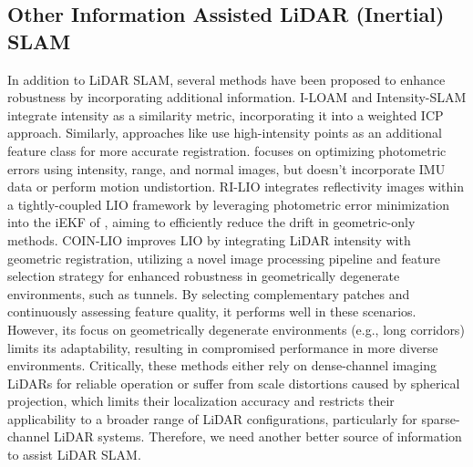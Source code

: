 
\vspace{-1mm}

\subsection{Other Information Assisted LiDAR (Inertial) SLAM}
\vspace{-1mm}
In addition to LiDAR SLAM, several methods have been proposed to enhance robustness by incorporating additional information. I-LOAM \cite{I-LOAM} and Intensity-SLAM \cite{I-SLAM} integrate intensity as a similarity metric, incorporating it into a weighted ICP approach. Similarly, approaches like \cite{I-LOAM,I-SLAM} use high-intensity points as an additional feature class for more accurate registration. \cite{MD-SLAM} focuses on optimizing photometric errors using intensity, range, and normal images, but doesn't incorporate IMU data or perform motion undistortion. RI-LIO \cite{RI-LIO} integrates reflectivity images within a tightly-coupled LIO framework by leveraging photometric error minimization into the iEKF of \cite{FAST-LIO}, aiming to efficiently reduce the drift in geometric-only methods. COIN-LIO \cite{COIN-LIO} improves LIO by integrating LiDAR intensity with geometric registration, utilizing a novel image processing pipeline and feature selection strategy for enhanced robustness in geometrically degenerate environments, such as tunnels. By selecting complementary patches and continuously assessing feature quality, it performs well in these scenarios. However, its focus on geometrically degenerate environments (e.g., long corridors) limits its adaptability, resulting in compromised performance in more diverse environments. Critically, these methods either rely on dense-channel imaging LiDARs for reliable operation or suffer from scale distortions caused by spherical projection, which limits their localization accuracy and restricts their applicability to a broader range of LiDAR configurations, particularly for sparse-channel LiDAR systems. Therefore, we need another better source of information to assist LiDAR SLAM. 

